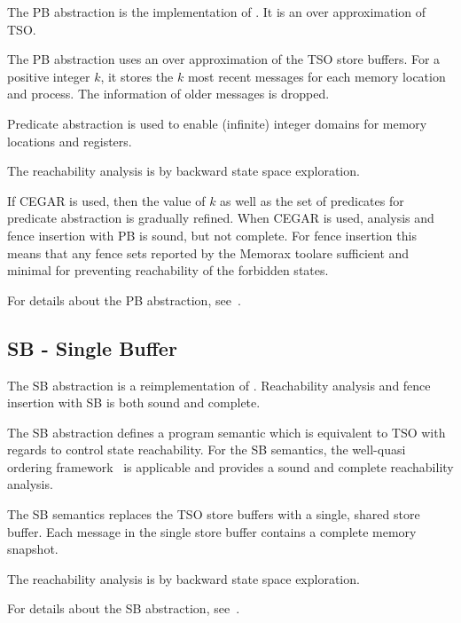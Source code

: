 \documentclass[a4paper]{article}
\newcommand{\thetool}{the Memorax tool} %
\begin{document}
The PB abstraction is the implementation of \cite{AACLR12SAS}. It is
an over approximation of TSO.

The PB abstraction uses an over approximation of the TSO store
buffers. For a positive integer $k$, it stores the $k$ most recent
messages for each memory location and process. The information of
older messages is dropped.

Predicate abstraction is used to enable (infinite) integer domains for
memory locations and registers.

The reachability analysis is by backward state space exploration.

If CEGAR is used, then the value of $k$ as well as the set of
predicates for predicate abstraction is gradually refined. When CEGAR
is used, analysis and fence insertion with PB is sound, but not
complete. For fence insertion this means that any fence sets reported
by \thetool are sufficient and minimal for preventing reachability of
the forbidden states.

For details about the PB abstraction, see~\cite{AACLR12SAS}.

\subsection{SB - Single Buffer}

The SB abstraction is a reimplementation of
\cite{AACLR12}. Reachability analysis and fence insertion with SB is
both sound and complete.

The SB abstraction defines a program semantic which is equivalent to
TSO with regards to control state reachability. For the SB semantics,
the well-quasi ordering framework~\cite{ACJT96} is applicable and
provides a sound and complete reachability analysis.

The SB semantics replaces the TSO store buffers with a single, shared
store buffer. Each message in the single store buffer contains a
complete memory snapshot.

The reachability analysis is by backward state space exploration.

For details about the SB abstraction, see~\cite{AACLR12}.

{}



\pagebreak
{}
{}

\end{document}

